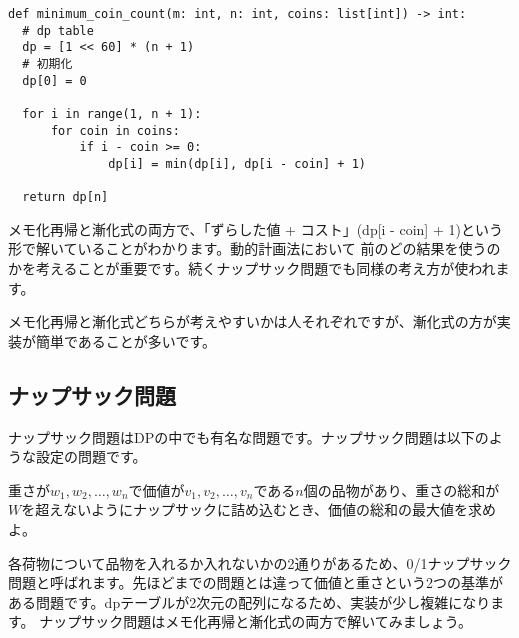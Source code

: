 \documentclass{jlreq}
\begin{document}
\begin{lstlisting}[caption=漸化式を用いたコイン問題の実装, frame=TRBL, label={dp_coin}]
def minimum_coin_count(m: int, n: int, coins: list[int]) -> int:
  # dp table
  dp = [1 << 60] * (n + 1)
  # 初期化
  dp[0] = 0
  
  for i in range(1, n + 1):
      for coin in coins:
          if i - coin >= 0:
              dp[i] = min(dp[i], dp[i - coin] + 1)
  
  return dp[n]
\end{lstlisting}

メモ化再帰と漸化式の両方で、「ずらした値 + コスト」(dp[i - coin] + 1)という形で解いていることがわかります。動的計画法において
前のどの結果を使うのかを考えることが重要です。続くナップサック問題でも同様の考え方が使われます。

メモ化再帰と漸化式どちらが考えやすいかは人それぞれですが、漸化式の方が実装が簡単であることが多いです。

\subsection{ナップサック問題}
ナップサック問題はDPの中でも有名な問題です。ナップサック問題は以下のような設定の問題です。

\begin{problem}
  重さが$w_1, w_2, \ldots, w_n$で価値が$v_1, v_2, \ldots, v_n$である$n$個の品物があり、重さの総和が$W$を超えないようにナップサックに詰め込むとき、価値の総和の最大値を求めよ。
\end{problem}

各荷物について品物を入れるか入れないかの2通りがあるため、0/1ナップサック問題と呼ばれます。先ほどまでの問題とは違って価値と重さという2つの基準がある問題です。dpテーブルが2次元の配列になるため、実装が少し複雑になります。
ナップサック問題はメモ化再帰と漸化式の両方で解いてみましょう。
\end{document}
